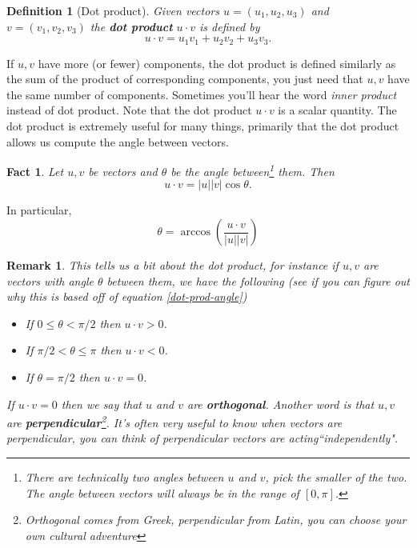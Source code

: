 \documentclass[12pt]{article}
\numberwithin{equation}{subsection}
\numberwithin{figure}{subsection}
\newtheorem{defn}[subsection]{Definition}
\newtheorem{fact}[subsection]{Fact}
\theoremstyle{note}
\newtheorem{remark}[subsection]{Remark}
\begin{document}
{\begin{defn}[Dot product] Given vectors $u=(u_1 ,u_2, u_3)$ and $v=(v_1,v_2,v_3)$ the \textbf{dot product} $u\cdot v$ is defined by \begin{equation} u\cdot v=u_1 v_1+u_2 v_2+u_3 v_3.\end{equation}
\end{defn}

If $u,v$ have more (or fewer) components, the dot product is defined similarly as the sum of the product of corresponding components, you just need that $u,v$ have the same number of components. Sometimes you'll hear the word \textit{inner product} instead of dot product. Note that the dot product $u\cdot v$ is a scalar quantity. The dot product is extremely useful for many things, primarily that the dot product allows us compute the angle between vectors. 

\begin{fact} Let $u,v$ be vectors and  $\theta$ be the angle between\footnote{There are technically two angles between $u$ and $v$, pick the smaller of the two. The angle between vectors will always be in the range of $[0,\pi]$.} them. Then \begin{equation}\label{dot-prod-angle} u\cdot v= |u| |v|\cos \theta.\end{equation}
\end{fact}

In particular, \[\theta=\arccos\left( \dfrac{u\cdot v}{|u||v|}\right)\]
\begin{remark} This tells us a bit about the dot product, for instance if $u,v$ are vectors with angle $\theta$ between them, we have the following (see if you can figure out why this is based off of equation \eqref{dot-prod-angle})
\begin{itemize}
	\item If $0\leq \theta< \pi/2$ then $u\cdot v>0$.
	\item If $\pi/2 < \theta \leq \pi$ then $u\cdot v<0$.
	\item If $\theta=\pi/2$ then $u\cdot v=0$.
\end{itemize}
If $u\cdot v=0$ then we say that $u$ and $v$ are \textbf{orthogonal}. Another word is that $u,v$ are \textbf{perpendicular}\footnote{Orthogonal comes from Greek, perpendicular from Latin, you can choose your own cultural adventure}. It's often very useful to know when vectors are perpendicular, you can think of perpendicular vectors are acting``independently".
\end{remark}

}
\end{document}
